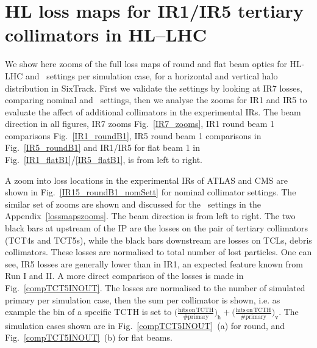 \section{HL loss maps for IR1/IR5 tertiary collimators in HL--LHC \label{lossmapszooms}}

We show here zooms of the full loss maps of round and flat beam optics for HL-LHC and \twosigmaret~settings per simulation case, for a horizontal and vertical halo distribution in SixTrack. First we validate the settings by looking at IR7 losses, comparing nominal and \twosigmaret~settings, then we analyse the zooms for IR1 and IR5 to evaluate the affect of additional collimators in the experimental IRs. The beam direction in all figures, IR7 zooms Fig.~\ref{IR7_zooms}, IR1 round beam 1 comparisons Fig.~\ref{IR1_roundB1}, IR5 round beam 1 comparisons in Fig.~\ref{IR5_roundB1} and IR1/IR5 for flat beam 1 in Fig.~\ref{IR1_flatB1}/\ref{IR5_flatB1}, is from left to right. 



A zoom into loss locations in the experimental IRs of ATLAS and CMS are shown in Fig.~\ref{IR15_roundB1_nomSett} for nominal collimator settings. The similar set of zooms are shown and discussed for the \twosigmaret~settings in the Appendix~\ref{lossmapszooms}. The beam direction is from left to right. The two black bars at upstream of the IP are the losses on the pair of tertiary collimators (TCT4s and TCT5s), while the black bars downstream are losses on TCLs, debris collimators. These losses are normalised to total number of lost particles. One can see, IR5 losses are generally lower than in IR1, an expected feature known from Run I and II. A more direct comparison of the losses is made in Fig.~\ref{compTCT5INOUT}. The losses are normalised to the number of simulated primary per simulation case, then the sum per collimator is shown, i.e. as example the bin of a specific TCTH is set to $\big(\frac{\mathrm{hits\,on\,TCTH}}{\#\mathrm{primary}}\big)_{\mathrm{h}} + \big(\frac{\mathrm{hits\,on\,TCTH}}{\#\mathrm{primary}}\big)_{\mathrm{v}}$. The simulation cases shown are in Fig.~\ref{compTCT5INOUT}~(a) for round, and Fig.~\ref{compTCT5INOUT}~(b) for flat beams.

